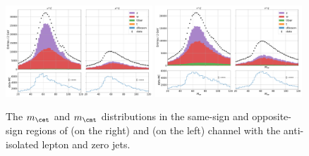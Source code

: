 \begin{figure}[h]
    \centering
    \includegraphics[width=0.49\textwidth]{chapters/Analysis/sectionBackground/figures/ltau_kinematics/mutau_cr.pdf}
    \includegraphics[width=0.49\textwidth]{chapters/Analysis/sectionBackground/figures/ltau_kinematics/etau_cr.pdf}
    \caption{The $m_{\cet}$ and $m_{\cmt}$ distributions in the same-sign and opposite-sign regions of \cet (on the right) and \cmt (on the left) channel with the anti-isolated lepton and zero jets.}
    \label{fig:background:ltau:mass_ltau_antiiso}
\end{figure}


